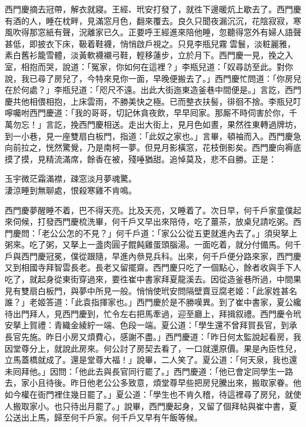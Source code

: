 西門慶摘去冠帶，解衣就寢。王經、玳安打發了，就徃下邊暖炕上歇去了。西門慶有酒的人，睡在枕畔，見滿窓月色，翻來覆去。良久只聞夜漏沉沉，花陰寂寂，寒風吹得那窓紙有聲，況離家已久。正要呼王經進來陪他睡，忽聽得窓外有婦人語聲甚低，即披衣下床，靸着鞋襪，悄悄啟戶視之。只見李瓶兒霧𩬆雲鬟，淡粧麗雅，素白舊衫籠雪體，淡黃軟襪襯弓鞋，輕移蓮步，立於月下。{}西門慶一見，挽之入室，相抱而哭，說道：「冤家，你如何在這裡？」李瓶兒道：「奴尋訪至此。對你說，我已尋了房兒了，今特來見你一面，早晚便搬去了。」西門慶忙問道：「你房兒在於何處？」李瓶兒道：「咫尺不遠。出此大街迤東造釜巷中間便是。」言訖，西門慶共他相偎相抱，上床雲雨，不勝美快之極。已而整衣扶髻，徘徊不捨。李瓶兒叮嚀囑咐西門慶道：「我的哥哥，切記休貪夜飲，早早囘家。那厮不時伺害於你，千萬勿忘！」言訖，挽西門慶相送。走出大街上，見月色如晝，果然徃東轉過牌坊，到一小巷，見一座雙扇白板門，指道：「此奴之家也。」言畢，頓袖而入。西門慶急向前拉之，恍然驚覺，乃是南柯一夢。但見月影橫窓，花枝倒影矣。{}西門慶向褥底摸了摸，見精流滿席，餘香在被，殘唾猶甜。追悼莫及，悲不自勝。正是：

\begin{myquote}
玉宇微茫霜滿襟，疎窓淡月夢魂驚。\\淒涼睡到無聊處，恨殺寒雞不肯鳴。
\end{myquote}

西門慶夢醒睡不着，巴不得天亮。比及天亮，又睡着了。次日早，何千戶家童僕起來伺候，打發西門慶梳洗畢，何千戶又早出來陪侍，吃了薑茶，放桌兒請吃粥。西門慶問：「老公公怎的不見？」何千戶道：「家公公從五更就進內去了。」須臾拏上粥來。吃了粥，又拏上一盞肉圓子餛飩雞蛋頭腦湯。一面吃着，就分付備馬。何千戶與西門慶冠冕，僕從跟隨，早進內叅見兵科。出來，何千戶便分路來家，西門慶又到相國寺拜智雲長老。{}長老又留擺齋。西門慶只吃了一個點心，餘者收與手下人吃了，就起身從東街穿過來，要徃崔中書家拜夏龍溪去。因從造釜巷所過，中間果見有雙扇白板門，與夢中所見一般。悄悄使玳安問隔壁賣豆腐老姬：「此家姓甚名誰？」老姬答道：「此袁指揮家也。」西門慶於是不勝嘆異。到了崔中書家，夏公纔待出門拜人，見西門慶到，忙令左右把馬牽過，迎至廳上，拜揖叙禮。西門慶令玳安拏上賀禮：青織金綾紵一端、色段一端。夏公道：「學生還不曾拜賀長官，到承長官先施。昨日小房又煩費心，感謝不盡。」西門慶道：「昨日何太監說起看房，我因堂尊分上，就說此房來。何公討了房契去看了，一口就還原價。果是內臣性兒，立馬蓋橋就成了。還是堂尊大福！」說畢，二人笑了。夏公道：「何天泉，我也還未囘拜他。」因問：「他此去與長官同行罷了。」西門慶道：「他已會定同學生一路去，家小且待後。昨日他老公公多致意，煩堂尊早些把房兒騰出來，搬取家眷。他如今權在衙門裡住幾日罷了。」夏公道：「學生也不肯久稽，待這裡尋了房兒，就使人搬取家小。也只待出月罷了。」說畢，西門慶起身，又留了個拜帖與崔中書，夏公送出上馬，歸至何千戶家。何千戶又早有午飯等候。

